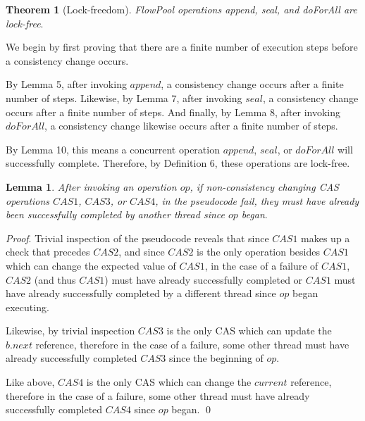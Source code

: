 \documentclass[runningheads,a4paper]{llncs}
\begin{document}
% 
%

\textbf{Theorem 1} (Lock-freedom). \textit{FlowPool operations append, seal,
and doForAll are lock-free}.

We begin by first proving that there are a finite number of execution steps
before a consistency change occurs.

By Lemma 5, after invoking $append$, a consistency change occurs after a
finite number of steps. Likewise, by Lemma 7, after invoking $seal$, a
consistency change occurs after a finite number of steps. And finally, by
Lemma 8, after invoking $doForAll$, a consistency change likewise occurs after
a finite number of steps.

By Lemma 10, this means a concurrent operation $append$, $seal$, or $doForAll$
will successfully complete. Therefore, by Definition 6, these operations are
lock-free.



\textbf{Lemma 1}. \textit{After invoking an operation $op$, if non-consistency
changing CAS operations $CAS1$, $CAS3$, or $CAS4$, in the pseudocode fail,
they must have already been successfully completed by another thread since
$op$ began}.

\textit{Proof}. Trivial inspection of the pseudocode reveals that since $CAS1$
makes up a check that precedes $CAS2$, and since $CAS2$ is the only operation
besides $CAS1$ which can change the expected value of $CAS1$, in the case of
a failure of $CAS1$, $CAS2$ (and thus $CAS1$) must have already successfully
completed or $CAS1$ must have already successfully completed by a different
thread since $op$ began executing.

Likewise, by trivial inspection $CAS3$ is the only CAS which can update the
$b.next$ reference, therefore in the case of a failure, some other thread must
have already successfully completed $CAS3$ since the beginning of $op$.

Like above, $CAS4$ is the only CAS which can change the $current$ reference,
therefore in the case of a failure, some other thread must have already
successfully completed $CAS4$ since $op$ began.
\qed

\end{document}
